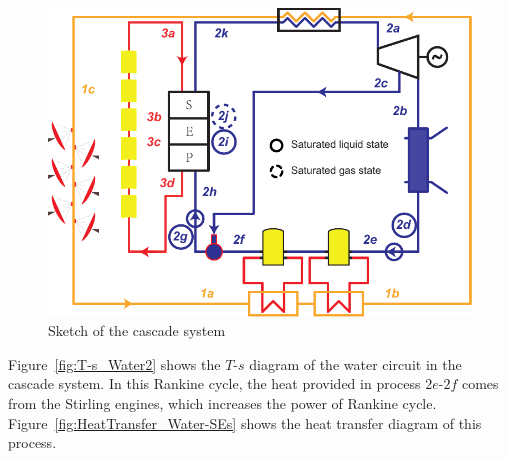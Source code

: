 \noindent \begin{figure}[htbp]
\begin{center}
	\includegraphics[width = 0.8\columnwidth]{fig/cascadeSystem}
	\caption{Sketch of the cascade system}
	\label{fig:System-1}
\end{center}
\end{figure}

Figure~\ref{fig:T-s_Water2} shows the $T$-$s$ diagram of the water circuit in the cascade system. In this Rankine cycle, the heat provided in process $2e$-$2f$ comes from the Stirling engines, which increases the power of Rankine cycle. Figure~\ref{fig:HeatTransfer_Water-SEs} shows the heat transfer diagram of this process.

